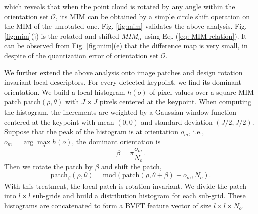 \documentclass[letterpaper, 10 pt, journal, twoside]{IEEEtran}
\begin{document}
which reveals that when the point cloud is rotated by any angle within the orientation set $\mathcal{O}$, its MIM can be obtained by a simple circle shift operation on the MIM of the unrotated one. Fig. \ref{fig:mim} validates the above analysis. Fig. \ref{fig:mim}(j) is the rotated and shifted $MIM_\alpha$ using Eq. (\ref{eq: MIM relation}). It can be observed from Fig. \ref{fig:mim}(e) that the difference map is very small, in despite of the quantization error of orientation set $\mathcal{O}$.%







We further extend the above analysis onto image patches and design rotation invariant local descriptors. For every detected keypoint, we find its dominant orientation. We build a local histogram $h(o)$ of pixel values over a square MIM patch $\mathrm{patch}(\rho,\theta)$ with $J\times J$ pixels centered at the keypoint. When computing the histogram, the increments are weighted by a Gaussian window function centered at the keypoint with mean $(0,0)$ and standard deviation $(J/2,J/2)$. Suppose that the peak of the histogram is at orientation $o_{m}$, i.e., $o_{m}=\arg\max\limits_{o} h(o)$, the dominant orientation is
\begin{equation}
        \label{eq: dominant orientation}
\beta = \pi\frac{o_{m}}{N_o}.
\end{equation}
Then we rotate the patch by $\beta$ and shift the patch,
\begin{equation}
        \label{eq: patch relation}
        \mathrm{patch}_\beta(\rho,\theta)=\mathrm{mod}(\mathrm{patch}(\rho,\theta+\beta)-o_{m},N_o).
\end{equation}
With this treatment, the local patch is rotation invariant. We divide the patch into $l\times l$ sub-grids and build a distribution histogram for each sub-grid. These histograms are concatenated to form a BVFT feature vector of size $l\times l\times N_o$. 
\end{document}
